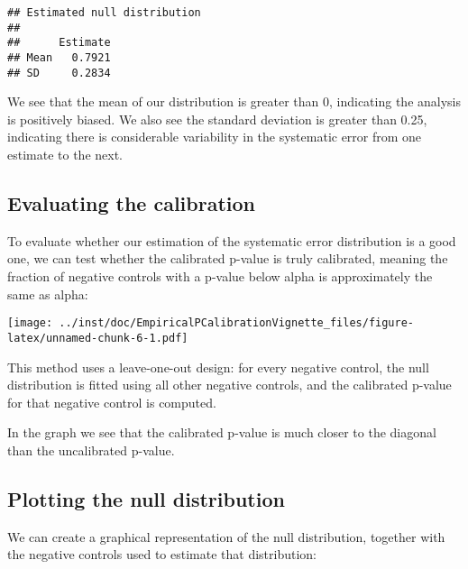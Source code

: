 \documentclass[
]{article}
\newenvironment{Shaded}{\begin{snugshade}}{\end{snugshade}}
\newcommand{\KeywordTok}[1]{\textcolor[rgb]{0.13,0.29,0.53}{\textbf{#1}}}
\newcommand{\NormalTok}[1]{#1}
\newcommand{\OperatorTok}[1]{\textcolor[rgb]{0.81,0.36,0.00}{\textbf{#1}}}
\begin{document}
\begin{verbatim}
## Estimated null distribution
## 
##      Estimate
## Mean   0.7921
## SD     0.2834
\end{verbatim}

We see that the mean of our distribution is greater than 0, indicating
the analysis is positively biased. We also see the standard deviation is
greater than 0.25, indicating there is considerable variability in the
systematic error from one estimate to the next.

\hypertarget{evaluating-the-calibration}{%
\subsection{Evaluating the
calibration}\label{evaluating-the-calibration}}

To evaluate whether our estimation of the systematic error distribution
is a good one, we can test whether the calibrated p-value is truly
calibrated, meaning the fraction of negative controls with a p-value
below alpha is approximately the same as alpha:

\begin{Shaded}
\end{Shaded}

\texttt{[image: ../inst/doc/EmpiricalPCalibrationVignette\_files/figure-latex/unnamed-chunk-6-1.pdf]}

This method uses a leave-one-out design: for every negative control, the
null distribution is fitted using all other negative controls, and the
calibrated p-value for that negative control is computed.

In the graph we see that the calibrated p-value is much closer to the
diagonal than the uncalibrated p-value.

\hypertarget{plotting-the-null-distribution}{%
\subsection{Plotting the null
distribution}\label{plotting-the-null-distribution}}

We can create a graphical representation of the null distribution,
together with the negative controls used to estimate that distribution:
\end{document}
